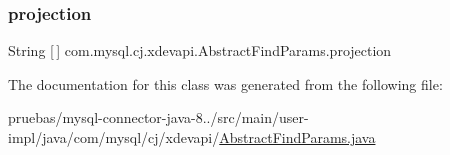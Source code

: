 \mbox{\label{classcom_1_1mysql_1_1cj_1_1xdevapi_1_1_abstract_find_params_aa2f21464c6948fd8938d5663b997a18a}} 
\subsubsection{\texorpdfstring{projection}{projection}}
{\footnotesize\ttfamily String \mbox{[}$\,$\mbox{]} com.\+mysql.\+cj.\+xdevapi.\+Abstract\+Find\+Params.\+projection\hspace{0.3cm}{\ttfamily [protected]}}



The documentation for this class was generated from the following file\+:\begin{DoxyCompactItemize}
\item 
pruebas/mysql-\/connector-\/java-\/8../src/main/user-\/impl/java/com/mysql/cj/xdevapi/\mbox{\hyperlink{_abstract_find_params_8java}{Abstract\+Find\+Params.\+java}}\end{DoxyCompactItemize}
